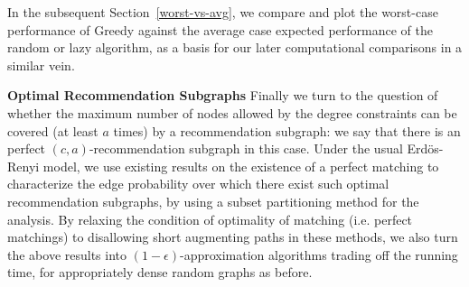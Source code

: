In the subsequent Section~\ref{worst-vs-avg}, we compare and plot the worst-case
performance of Greedy against the average case expected performance of the random
or lazy algorithm, as a basis for our later computational comparisons in a
similar vein. \vs

{\bf Optimal Recommendation Subgraphs}
Finally we turn to the question of whether the maximum number of nodes allowed
by the degree constraints can be covered (at least $a$ times) by a recommendation
subgraph: we say that there is an perfect $(c,a)$-recommendation subgraph in this
case. Under the usual Erd\"os-Renyi model, we use existing results on the
existence of a perfect matching to characterize the edge probability over which
there exist such optimal recommendation subgraphs, by using a subset partitioning
method for the analysis. By relaxing the condition of optimality of matching (i.e.
perfect matchings) to disallowing short augmenting paths in these methods, we also
turn the above results into $(1-\epsilon)$-approximation algorithms trading off
the running time, for appropriately dense random graphs as before. \vs




